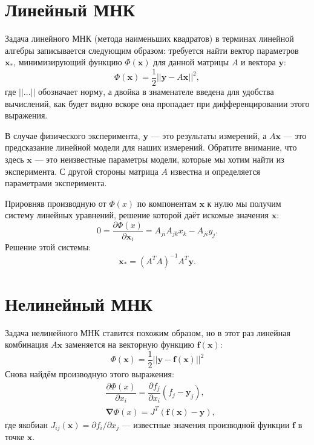 \documentclass[fontsize=12pt, paper=a4]{article}
\renewcommand{\vec}[1]{\mathbf{#1}}
\def\x{\vec{x}}
\def\y{\vec{y}}
\def\f{\vec{f}}
\def\vnabla{\vec{\nabla}}
\def\m{\x_*}
\begin{document}
\section{Линейный МНК}
Задача линейного МНК (метода наименьших квадратов) в терминах линейной алгебры записывается следующим образом: требуется найти вектор параметров $\m$, минимизирующий функцию $\Phi(\x)$ для данной матрицы $A$ и вектора $\y$:
$$
\Phi(\vec{x}) = \dfrac12 ||\y - A\x||^2,
$$
где $||...||$ обозначает норму, а двойка в знаменателе введена для удобства вычислений, как будет видно вскоре она пропадает при дифференцировании этого выражения.

В случае физического эксперимента, $\y$ — это результаты измерений, а $A\x$ — это предсказание линейной модели для наших измерений.
Обратите внимание, что здесь $\x$ — это неизвестные параметры модели, которые мы хотим найти из эксперимента.
С другой стороны матрица $A$ известна и определяется параметрами эксперимента.

Прировняв производную от $\Phi(x)$ по компонентам $\x$ к нулю мы получим систему линейных уравнений, решение которой даёт искомые значения $\x$:
\begin{equation}
0 = \dfrac{\partial \Phi(x)}{\partial \x_i} = A_{ji} A_{jk} x_k - A_{ji} y_j.
\end{equation}
Решение этой системы:
\begin{equation}
\m = (A^TA)^{-1} A^T \y.
\end{equation}

\section{Нелинейный МНК}
Задача нелинейного МНК ставится похожим образом, но в этот раз линейная комбинация  $A\x$ заменяется на векторную функцию $\f(\x)$:
\begin{equation}
\Phi(\x) = \dfrac12 ||\y - \f(\x)||^2 \label{eq.def_phi}
\end{equation}
Снова найдём производную этого выражения:
\begin{eqnarray}
&\dfrac{\partial \Phi(x)}{\partial x_i} = \dfrac{\partial f_j}{\partial x_i} (f_j - \y_j), \\
&\vnabla \Phi(x) = J^T (\f(\x) - \y), \label{eq.nablaPhi}
\end{eqnarray}
где якобиан $J_{ij}(\x) = \partial f_i / \partial x_j$ — известные значения производной функции $\f$ в точке $\x$.
\end{document}
